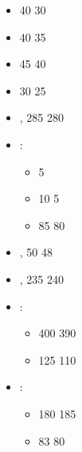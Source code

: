 \largefontsize{}

\subtitle{beta 2.2}

\begin{itemize}
\item \headhunter{} 40 \costdown{} 30
\item \firebrand{} 40 \costdown{} 35
\item \karkadansresilience{} 45 \costdown{} 40
\item \rampagerschain{} 30 \costdown{} 25
\item \greatkhan{}, \basecost{} 285 \costdown{} 280
\item \mammothhunter{}\spacebeforecolon{}:
\begin{itemize}
\item \leaderofthepack{} \free{} \costup{} 5
\item \pw{} 10 \costup{} 5
\item \tusker{} 85 \costdown{} 80
\end{itemize}
\item \tribesmen{}, \extramodel{} 50 \costdown{} 48
\item \mercenaryveterans{}, \basecost{} 235 \costup{} 240
\item \tuskercavalry{}\spacebeforecolon{}:
\begin{itemize}
\item \basecost{} 400 \costdown{} 390
\item \extramodel{} 125 \costdown{} 110
\end{itemize}
\item \bombardiers{}\spacebeforecolon{}:
\begin{itemize}
\item \basecost{} 180 \costup{} 185
\item \extramodel{} 83 \costdown{} 80
\end{itemize}
\end{itemize}
